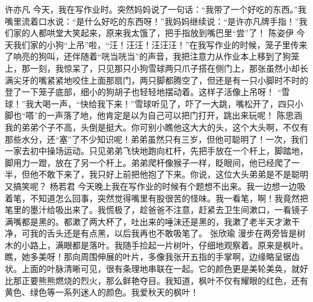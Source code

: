 \markdownRendererDocumentBegin
{}\markdownRendererInterblockSeparator
{}\markdownRendererInterblockSeparator
{}许亦凡\markdownRendererInterblockSeparator
{}今天，我在写作业时。突然妈妈说了一句话：“我带了一个好吃的东西。”我嘴里流着口水说：“是什么好吃的东西呀！”我妈妈继续说：“是许亦凡牌手指！”我们家的人都哄堂大笑起来，原来我太饿了，把手指放到嘴巴里“尝”了！ \markdownRendererInterblockSeparator
{}\markdownRendererInterblockSeparator
{}陈姿伊\markdownRendererInterblockSeparator
{}今天我们家的小狗“上吊”啦，“汪！汪汪！汪汪汪！”在我写作业的时候，笼子里传来了响亮的狗叫，还伴随着“咣当咣当”的声音，我把注意力从作业本上移到了狗笼上，那一刻，我惊呆了，只见那只小狗雪球两只爪子搭在侧门上，那张虽然小却长满尖牙的嘴紧紧地咬住上面那扇门，两只脚都腾空了，但还是有一只小脚时不时的登了一下笼子底部，细小的狗胡子也轻轻地摆动着。这样子活像上吊呀！\markdownRendererInterblockSeparator
{}“雪球！”我大喝一声，“快给我下来！”雪球听见了，吓了一大跳，嘴松开了，四只小脚也“嗒”的一声落了地，他肯定是以为自己可以把门打开，跳出来玩呢！\markdownRendererInterblockSeparator
{}\markdownRendererInterblockSeparator
{}陈思涵\markdownRendererInterblockSeparator
{}我的弟弟个子不高，头倒是挺大。你可别小瞧他这大大的头，这个大头啊，不仅有那些水分，还“塞”了不少知识呢！弟弟虽然只有三岁，但他可聪明了！一次，我们一家去初中操场运动。只见弟弟飞快地跑向杠杆，先把手放在一个杆上，脚踏地，脚用力一蹬，放在了另一个杆上。弟弟爬杆像猴子一样，眨眼间，他已经爬了一半，但他不敢下来了，我只好上前把他抱了下来。你说，这位大头弟弟是不是聪明又搞笑呢？ \markdownRendererInterblockSeparator
{}\markdownRendererInterblockSeparator
{}杨若君\markdownRendererInterblockSeparator
{}今天晚上我在写作业的时候有个题想不出来。我一边想一边吸着笔，不知道怎么回事，突然觉得嘴里有股很苦的怪味。我一看笔，啊！我竟然把笔里的墨汁给吸出来了。我慌极了，趁爸爸不注意，赶紧去卫生间漱口，一看镜子满嘴都是黑的。都漱了两大杯了，吐出来的唾沫还是黑的，我漱了老半天才漱干净，可我的舌头还是有点黑，以后我再也不敢吸笔了。 \markdownRendererInterblockSeparator
{}\markdownRendererInterblockSeparator
{}张欣瑜\markdownRendererInterblockSeparator
{}漫步在两旁皆是树木的小路上，满眼都是落叶。我随手捡起一片树叶，仔细地观察着。原来是枫叶。瞧，她多美呀！那向周围伸展的叶片，多像我张开五指的手掌啊，边缘略呈锯齿状。上面的叶脉清晰可见，很有条理地串联在一起。它的颜色更是美轮美奂，就好比那正要熊熊燃烧的烈火，那么鲜艳夺目。我知道，枫叶不仅有耀眼的红色，还有黄色、绿色等一系列迷人的颜色。我爱秋天的枫叶！\markdownRendererInterblockSeparator

